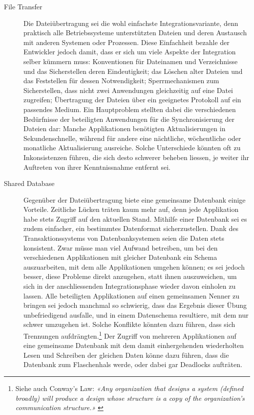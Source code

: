 \begin{description}
    \item[File Transfer] Die Dateiübertragung sei die wohl einfachste Integrationsvariante, denn praktisch alle Betriebssysteme unterstützten Dateien und deren Austausch mit anderen Systemen oder Prozessen. Diese Einfachheit bezahle der Entwickler jedoch damit, dass er sich um viele Aspekte der Integration selber kümmern muss: Konventionen für Dateinamen und Verzeichnisse und das Sicherstellen deren Eindeutigkeit; das Löschen alter Dateien und das Feststellen für dessen Notwendigkeit; Sperrmechanismen zum Sicherstellen, dass nicht zwei Anwendungen gleichzeitig auf eine Datei zugreifen; Übertragung der Dateien über ein geeignetes Protokoll auf ein passendes Medium. Ein Hauptproblem stellten dabei die verschiedenen Bedürfnisse der beteiligten Anwendungen für die Synchronisierung der Dateien dar: Manche Applikationen benötigten Aktualisierungen in Sekundenschnelle, während für andere eine nächtliche, wöchentliche oder monatliche Aktualisierung ausreiche. Solche Unterschiede könnten oft zu Inkonsistenzen führen, die sich desto schwerer beheben liessen, je weiter ihr Auftreten von ihrer Kenntnissnahme entfernt sei. \cite[S. 43-46]{enterprise-integration-patterns}
    \item[Shared Database] Gegenüber der Dateiübertragung biete eine gemeinsame Datenbank einige Vorteile. Zeitliche Lücken träten kaum mehr auf, denn jede Applikation habe stets Zugriff auf den aktuellen Stand. Mithilfe einer Datenbank sei es zudem einfacher, ein bestimmtes Datenformat sicherzustellen. Dank des Transaktionssystems von Datenbanksystemen seien die Daten stets konsistent. Zwar müsse man viel Aufwand betreiben, um bei den verschiedenen Applikationen mit gleicher Datenbank ein Schema auszuarbeiten, mit dem alle Applikationen umgehen können; es sei jedoch besser, diese Probleme direkt anzugehen, statt  ihnen auszuweichen, um sich in der anschliessenden Integrationsphase wieder davon einholen zu lassen. Alle beteiligten Applikationen auf einen gemeinsamen Nenner zu bringen sei jedoch manchmal so schwierig, dass das Ergebnis dieser Übung unbefriedigend ausfalle, und in einem Datenschema resultiere, mit dem nur schwer umzugehen ist. Solche Konflikte könnten dazu führen, dass sich Trennungen aufdrängten.\footnote{Siehe auch Conway's Law: \textit{«Any organization that designs a system (defined broadly) will produce a design whose structure is a copy of the organization's communication structure.»} \cite{conway1968committees}} Der Zugriff von mehreren Applikationen auf eine gemeinsame Datenbank mit dem damit einhergehenden wiederholten Lesen und Schreiben der gleichen Daten könne dazu führen, dass die Datenbank zum Flaschenhals werde, oder dabei gar Deadlocks aufträten. \cite[S. 47-49]{enterprise-integration-patterns}

\end{description}
